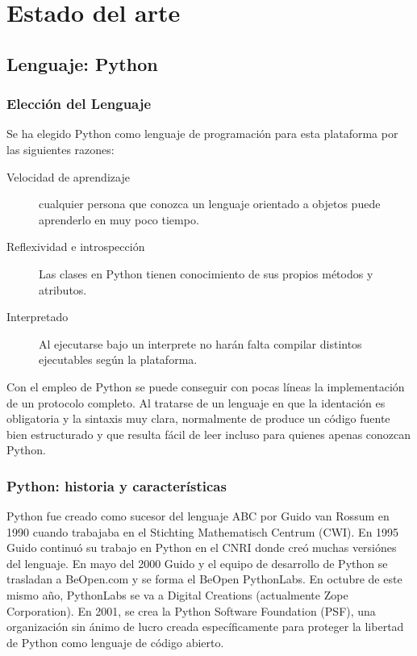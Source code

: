 \documentclass[a4paper,spanish,12pt]{book}
\begin{document}
\chapter{Estado del arte}

\section{Lenguaje: Python}
\subsection{Elecci\'on del Lenguaje} 
Se ha elegido Python como lenguaje de programaci\'on para esta plataforma por las siguientes razones:
\begin{description}
	\item[Velocidad de aprendizaje] cualquier persona que conozca un lenguaje orientado a objetos puede aprenderlo en muy poco tiempo.
	\item[Reflexividad e introspección] Las clases en Python tienen conocimiento de sus propios m\'etodos y atributos.
	\item[Interpretado] Al ejecutarse bajo un interprete no har\'an falta compilar distintos ejecutables seg\'un la plataforma.
\end{description}

Con el empleo de Python se puede conseguir con pocas líneas la implementaci\'on de un protocolo completo. Al tratarse de un lenguaje en que la identaci\'on es obligatoria y la sintaxis muy clara, normalmente de produce un código fuente bien estructurado y que resulta fácil de leer incluso para quienes apenas conozcan Python.

\subsection{Python: historia y características}

Python fue creado como sucesor del lenguaje ABC por Guido van Rossum en 1990 cuando trabajaba en el Stichting Mathematisch Centrum (CWI). En 1995 Guido continuó su trabajo en Python en el CNRI donde creó muchas versiónes del lenguaje. En mayo del 2000 Guido y el equipo de desarrollo de Python se trasladan a BeOpen.com y se forma el BeOpen PythonLabs. En octubre de este mismo año, PythonLabs se va a Digital Creations (actualmente Zope Corporation). En 2001, se crea la Python Software Foundation (PSF), una organización sin ánimo de lucro creada específicamente para proteger la libertad de Python como lenguaje de código abierto.
\end{document}

